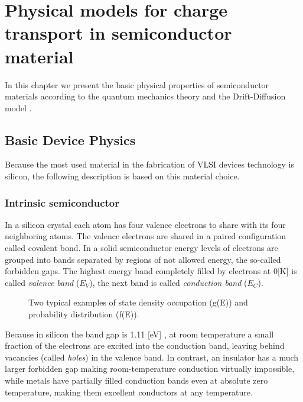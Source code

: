 \chapter{Physical models for charge transport in semiconductor material}

In this chapter we present the basic physical properties of semiconductor materials according to the quantum mechanics theory \citep{ModernVLSIdevices} and the Drift-Diffusion model \cite{Jackson:ElettroClassica}.

\section{Basic Device Physics}

Because the most used material in the fabrication of VLSI devices technology is silicon, the following description is based on this material choice.

\subsection{Intrinsic semiconductor}
In a silicon crystal each atom has four valence electrons to share with its four neighboring atoms. The valence electrons are shared in a paired configuration called covalent bond.  In a solid semiconductor energy levels of electrons are grouped into bands separated by regions of not allowed energy, the so-called forbidden gaps. The highest energy band completely filled by electrons at 0[K] is called \textit{valence band} ($E_V$), the next band is called \textit{conduction band} ($E_C$).

\begin{figure}[!h]
\centering
{}
\caption{Two typical examples of state density occupation (g(E)) and probability distribution (f(E)).  }
\label{fig: density occupation and prob}
\end{figure}

Because in silicon the band gap is 1.11 [eV] \cite{SolidState}, at room temperature a small fraction of the electrons are excited into the conduction band, leaving behind vacancies (called \textit{holes}) in the valence band.
In contrast, an insulator has a much larger forbidden gap making room-temperature conduction virtually impossible, while metals have partially filled conduction bands even at absolute zero temperature, making them excellent conductors at any temperature. 

